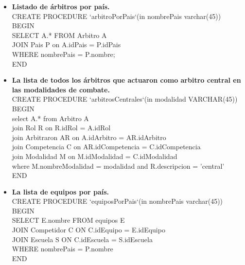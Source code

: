 \begin{itemize}
{		group by E.idEscuela\\
		order by oro desc, plata desc, bronce desc\;\\
END\\
}

\item{\textbf{Listado de árbitros por país.}\\
CREATE PROCEDURE `arbitroPorPais`(in nombrePais varchar(45))\\
BEGIN\\
SELECT A.* FROM Arbitro A\\
	JOIN Pais P on A.idPais = P.idPais\\
    WHERE nombrePais = P.nombre;\\
END\\
}

\item{\textbf{La lista de todos los árbitros que actuaron como arbitro central en las modalidades de combate.}\\
CREATE PROCEDURE `arbitrosCentrales`(in modalidad VARCHAR(45))\\
BEGIN\\
select A.* from Arbitro A\\
	join Rol R on R.idRol = A.idRol\\
	join Arbitraron AR on A.idArbitro = AR.idArbitro\\
    join Competencia C on AR.idCompetencia = C.idCompetencia\\
    join Modalidad M on M.idModalidad = C.idModalidad\\
    where M.nombreModalidad = modalidad and R.descripcion = 'central'\;\\
END\\
}

\item{\textbf{La lista de equipos por país.}\\
CREATE PROCEDURE `equiposPorPais`(in nombrePais varchar(45))\\
BEGIN\\
SELECT E.nombre FROM equipos E\\
	JOIN Competidor C ON C.idEquipo = E.idEquipo\\
	JOIN Escuela S ON C.idEscuela = S.idEscuela\\
	WHERE nombrePais = P.nombre\\
END\\
}
\end{itemize}